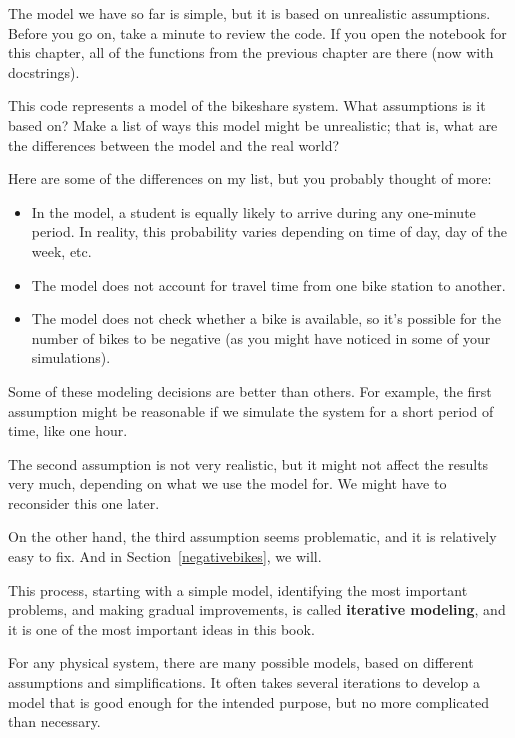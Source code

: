 \documentclass[12pt]{book}
\theoremstyle{exercise}
\begin{document}
The model we have so far is simple, but it is based on unrealistic assumptions.  Before you go on, take a minute to review the code.  If you open the notebook for this chapter, all of the functions from the previous chapter are there (now with docstrings).

This code represents a model of the bikeshare system.  What assumptions is it based on?  Make a list of ways this model might be unrealistic; that is, what are the differences between the model and the real world?

Here are some of the differences on my list, but you probably thought of more:

\begin{itemize}

\item In the model, a student is equally likely to arrive during any one-minute period.  In reality, this probability varies depending on time of day, day of the week, etc.

\item The model does not account for travel time from one bike station to another.

\item The model does not check whether a bike is available, so it's possible for the number of bikes to be negative (as you might have noticed in some of your simulations).

\end{itemize}

Some of these modeling decisions are better than others.  For example, the first assumption might be reasonable if we simulate the system for a short period of time, like one hour.

The second assumption is not very realistic, but it might not affect the results very much, depending on what we use the model for.  We might have to reconsider this one later.

On the other hand, the third assumption seems problematic, and it is relatively easy to fix.  And in Section~\ref{negativebikes}, we will.

This process, starting with a simple model, identifying the most important problems, and making gradual improvements, is called {\bf iterative modeling}, and it is one of the most important ideas in this book.

For any physical system, there are many possible models, based on different assumptions and simplifications.  It often takes several iterations to develop a model that is good enough for the intended purpose, but no more complicated than necessary.
\end{document}

